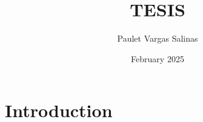 \documentclass{article}
\title{TESIS}
\author{Paulet Vargas Salinas}
\date{February 2025}
\begin{document}
\maketitle

\section{Introduction}
\end{document}
